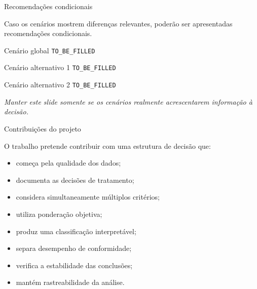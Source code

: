 
\begin{frame}{Recomendações condicionais}

    Caso os cenários mostrem diferenças relevantes, poderão ser
    apresentadas recomendações condicionais.

    \vspace{0.3cm}

    \begin{block}{Cenário global}
        \texttt{TO\_BE\_FILLED}
    \end{block}

    \begin{block}{Cenário alternativo 1}
        \texttt{TO\_BE\_FILLED}
    \end{block}

    \begin{block}{Cenário alternativo 2}
        \texttt{TO\_BE\_FILLED}
    \end{block}

    \vspace{0.2cm}

    \centering
    \textit{Manter este slide somente se os cenários realmente
    acrescentarem informação à decisão.}

\end{frame}



\begin{frame}{Contribuições do projeto}

    O trabalho pretende contribuir com uma estrutura de decisão que:

    \begin{itemize}
        \item começa pela qualidade dos dados;
        \item documenta as decisões de tratamento;
        \item considera simultaneamente múltiplos critérios;
        \item utiliza ponderação objetiva;
        \item produz uma classificação interpretável;
        \item separa desempenho de conformidade;
        \item verifica a estabilidade das conclusões;
        \item mantém rastreabilidade da análise.
    \end{itemize}

\end{frame}


